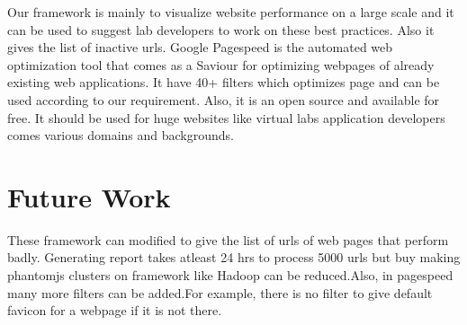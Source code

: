 \documentclass[a4paper,10pt]{IEEEtran}
\begin{document}
 Our framework is mainly to visualize website performance on a large scale and
it can be used to suggest lab developers to work on these best practices. Also it
gives the list of inactive urls. Google Pagespeed is the automated web optimization
tool that comes as a Saviour for optimizing webpages of already existing web applications. It have 40+
filters which optimizes page and can be used according to our requirement. Also,
it is an open source and available for free. It should be used for huge websites like virtual labs
application developers comes various domains and backgrounds.
 
\section{Future Work}\label{sec-8}
These framework can modified to give the list of urls of web pages that perform badly.
Generating report takes atleast 24 hrs to process 5000 urls but buy
making phantomjs clusters on framework like Hadoop can be reduced.Also, in pagespeed many
more filters can be added.For example, there is no filter to give default
favicon for a webpage if it is not there.
\end{document}
